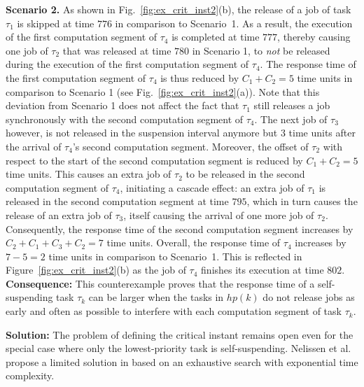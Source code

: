\noindent\textbf{Scenario 2.} As shown in Fig.~\ref{fig:ex_crit_inst2}(b), the release of a job of task $\tau_1$ is skipped at time $776$ in comparison to Scenario~1. As a result, the execution of the first computation segment of $\tau_4$ is completed at time $777$, thereby causing one job of $\tau_2$ that was released at time $780$ in Scenario 1, to \emph{not} be released during the execution of the first computation segment of $\tau_4$. The response time of the first computation segment of $\tau_4$ is thus reduced by $C_1 + C_2 = 5$ time units in comparison to Scenario 1 (see Fig.~\ref{fig:ex_crit_inst2}(a)). Note that this deviation from Scenario 1 does not affect the fact that $\tau_1$ still releases a job synchronously with the second computation segment of $\tau_4$. The next job of $\tau_3$ however, is not released in the suspension interval anymore but $3$ time units after the arrival of $\tau_4$'s second computation segment. Moreover, the offset of $\tau_2$ with respect to the start of the second computation segment is reduced by $C_1 + C_2 = 5$ time units. This causes an extra job of $\tau_2$ to be released in the second computation segment of $\tau_4$, initiating a cascade effect: an extra job of $\tau_1$ is released in the second computation segment at time $795$, which in turn causes the release of an extra job of $\tau_3$, itself causing the arrival of one more job of $\tau_2$. Consequently, the response time of the second computation segment increases by $C_2 + C_1 + C_3 + C_2 = 7$ time units. Overall, the response time of $\tau_4$ increases by $7 - 5 = 2$ time units in comparison to Scenario~1. This is reflected in Figure~\ref{fig:ex_crit_inst2}(b) as the job of $\tau_4$ finishes its execution at time $802$.\\


{\bf Consequence:} This counterexample proves that the response time of a self-suspending task $\tau_k$ can be larger when the tasks in $hp(k)$ do not release jobs as early and often as possible to interfere with each computation segment of task $\tau_k$.

{\bf Solution:} The problem of defining the critical instant remains open even for the special case where only the lowest-priority task is self-suspending. Nelissen et al. propose a limited solution in \cite{ecrts15nelissen} based on an exhaustive search with exponential time complexity.

\label{sec:wrong-highest-priority}

